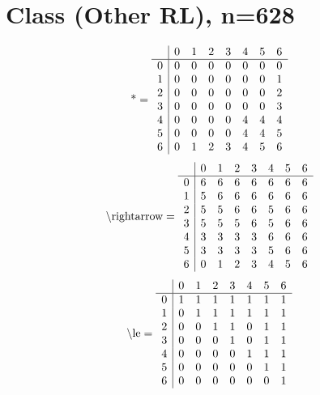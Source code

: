 \documentclass[11pt]{article}
\begin{document}
\section{Class (Other RL), n=628}
\[\text{*} = 
\begin{array}{r | r r r r r r r}
 & 0 & 1 & 2 & 3 & 4 & 5 & 6 \\ \hline
0 & 0 & 0 & 0 & 0 & 0 & 0 & 0 \\
1 & 0 & 0 & 0 & 0 & 0 & 0 & 1 \\
2 & 0 & 0 & 0 & 0 & 0 & 0 & 2 \\
3 & 0 & 0 & 0 & 0 & 0 & 0 & 3 \\
4 & 0 & 0 & 0 & 0 & 4 & 4 & 4 \\
5 & 0 & 0 & 0 & 0 & 4 & 4 & 5 \\
6 & 0 & 1 & 2 & 3 & 4 & 5 & 6 \\
\end{array}
\]
\[\text{\textbackslash rightarrow} = 
\begin{array}{r | r r r r r r r}
 & 0 & 1 & 2 & 3 & 4 & 5 & 6 \\ \hline
0 & 6 & 6 & 6 & 6 & 6 & 6 & 6 \\
1 & 5 & 6 & 6 & 6 & 6 & 6 & 6 \\
2 & 5 & 5 & 6 & 6 & 5 & 6 & 6 \\
3 & 5 & 5 & 5 & 6 & 5 & 6 & 6 \\
4 & 3 & 3 & 3 & 3 & 6 & 6 & 6 \\
5 & 3 & 3 & 3 & 3 & 5 & 6 & 6 \\
6 & 0 & 1 & 2 & 3 & 4 & 5 & 6 \\
\end{array}
\]
\[\text{\textbackslash le} = 
\begin{array}{r | r r r r r r r}
 & 0 & 1 & 2 & 3 & 4 & 5 & 6 \\ \hline
0 & 1 & 1 & 1 & 1 & 1 & 1 & 1 \\
1 & 0 & 1 & 1 & 1 & 1 & 1 & 1 \\
2 & 0 & 0 & 1 & 1 & 0 & 1 & 1 \\
3 & 0 & 0 & 0 & 1 & 0 & 1 & 1 \\
4 & 0 & 0 & 0 & 0 & 1 & 1 & 1 \\
5 & 0 & 0 & 0 & 0 & 0 & 1 & 1 \\
6 & 0 & 0 & 0 & 0 & 0 & 0 & 1 \\
\end{array}
\]
\end{document}
